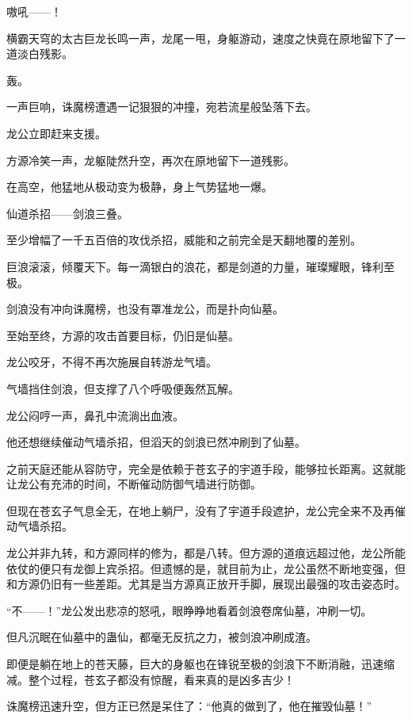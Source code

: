 
\begin{this_body}



嗷吼——！

横霸天穹的太古巨龙长鸣一声，龙尾一甩，身躯游动，速度之快竟在原地留下了一道淡白残影。

轰。

一声巨响，诛魔榜遭遇一记狠狠的冲撞，宛若流星般坠落下去。

龙公立即赶来支援。

方源冷笑一声，龙躯陡然升空，再次在原地留下一道残影。

在高空，他猛地从极动变为极静，身上气势猛地一爆。

仙道杀招——剑浪三叠。

至少增幅了一千五百倍的攻伐杀招，威能和之前完全是天翻地覆的差别。

巨浪滚滚，倾覆天下。每一滴银白的浪花，都是剑道的力量，璀璨耀眼，锋利至极。

剑浪没有冲向诛魔榜，也没有罩准龙公，而是扑向仙墓。

至始至终，方源的攻击首要目标，仍旧是仙墓。

龙公咬牙，不得不再次施展自转游龙气墙。

气墙挡住剑浪，但支撑了八个呼吸便轰然瓦解。

龙公闷哼一声，鼻孔中流淌出血液。

他还想继续催动气墙杀招，但滔天的剑浪已然冲刷到了仙墓。

之前天庭还能从容防守，完全是依赖于苍玄子的宇道手段，能够拉长距离。这就能让龙公有充沛的时间，不断催动防御气墙进行防御。

但现在苍玄子气息全无，在地上躺尸，没有了宇道手段遮护，龙公完全来不及再催动气墙杀招。

龙公并非九转，和方源同样的修为，都是八转。但方源的道痕远超过他，龙公所能依仗的便只有龙御上宾杀招。但遗憾的是，就目前为止，龙公虽然不断地变强，但和方源仍旧有一些差距。尤其是当方源真正放开手脚，展现出最强的攻击姿态时。

“不——！”龙公发出悲凉的怒吼，眼睁睁地看着剑浪卷席仙墓，冲刷一切。

但凡沉眠在仙墓中的蛊仙，都毫无反抗之力，被剑浪冲刷成渣。

即便是躺在地上的苍天藤，巨大的身躯也在锋锐至极的剑浪下不断消融，迅速缩减。整个过程，苍玄子都没有惊醒，看来真的是凶多吉少！

诛魔榜迅速升空，但方正已然是呆住了：“他真的做到了，他在摧毁仙墓！”


\end{this_body}
